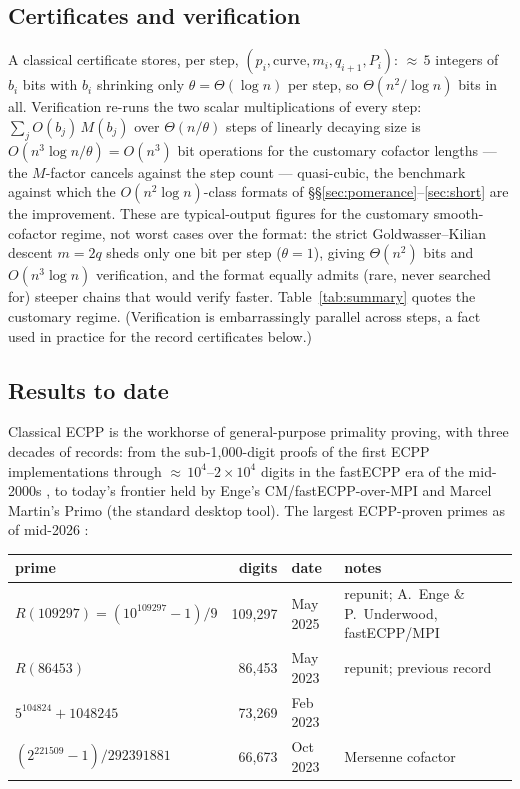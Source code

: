 \documentclass[11pt]{amsart}
\theoremstyle{plain}
\theoremstyle{definition}
\theoremstyle{remark}
\begin{document}
\subsection{Certificates and verification}\label{sec:ecppverif}

A classical certificate stores, per step,
$(p_i, \text{curve}, m_i, q_{i+1}, P_i)$: ${\approx}\,5$ integers of $b_i$ bits with $b_i$ shrinking
only $\theta = \Theta(\log n)$ per step, so $\Theta(n^2/\log n)$ bits in all.  Verification re-runs the
two scalar multiplications of every step: $\sum_j O(b_j)\,M(b_j)$ over $\Theta(n/\theta)$ steps of
linearly decaying size is $O(n^3\log n/\theta) = O(n^3)$ bit operations for the customary cofactor
lengths --- the $M$-factor cancels against the step count --- quasi-cubic, the benchmark against which
the $O(n^2\log n)$-class formats of \S\S\ref{sec:pomerance}--\ref{sec:short} are the improvement.
These are typical-output figures for the customary smooth-cofactor regime, not worst cases over the
format: the strict Goldwasser--Kilian descent $m = 2q$ sheds only one bit per step ($\theta = 1$),
giving $\Theta(n^2)$ bits and $O(n^3\log n)$ verification, and the format equally admits (rare,
never searched for) steeper chains that would verify faster.  Table~\ref{tab:summary} quotes the
customary regime.
(Verification is embarrassingly parallel across steps, a fact used in practice for the record
certificates below.)

\subsection{Results to date}\label{sec:ecppresults}

Classical ECPP is the workhorse of general-purpose primality proving, with three decades of records:
from the sub-1{,}000-digit proofs of the first ECPP implementations \cite{AM93} through
${\approx}\,10^4$--$2\times 10^4$ digits in the fastECPP era of the mid-2000s \cite{FKMW04,Mor07}, to
today's frontier held by Enge's CM/fastECPP-over-MPI \cite{Enge24} and Marcel Martin's Primo (the
standard desktop tool).  The largest ECPP-proven primes as of mid-2026 \cite{t5k}:

\begin{center}\footnotesize
\begin{tabular}{@{}lrll@{}}
\toprule
prime & digits & date & notes\\
\midrule
$R(109297) = (10^{109297}-1)/9$ & 109{,}297 & May 2025 & repunit; A.~Enge \& P.~Underwood, fastECPP/MPI\\
$R(86453)$ & 86{,}453 & May 2023 & repunit; previous record\\
$5^{104824}+1048245$ & 73{,}269 & Feb 2023 & \\
$(2^{221509}-1)/292391881$ & 66{,}673 & Oct 2023 & Mersenne cofactor\\
\bottomrule
\end{tabular}
\end{center}
\end{document}
